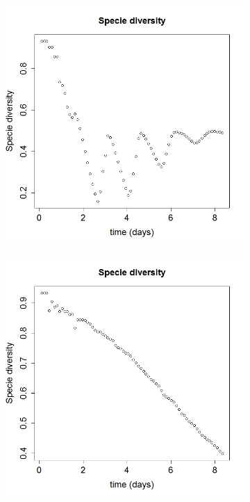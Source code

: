 \begin{acknowledgements}
\begin{figure}[!ht]
\begin{subfigure}[b]{.5\textwidth}
\end{subfigure}\vspace*{-0.4em}
\begin{subfigure}[b]{.5\textwidth}
\includegraphics[width=1\textwidth]{p2/s281}
\end{subfigure}\hspace*{-1.5em}
\centering
\begin{subfigure}[b]{.50\textwidth}
\includegraphics[width=1\textwidth]{p2/s280}

\end{subfigure}
\end{figure}
\end{acknowledgements}
